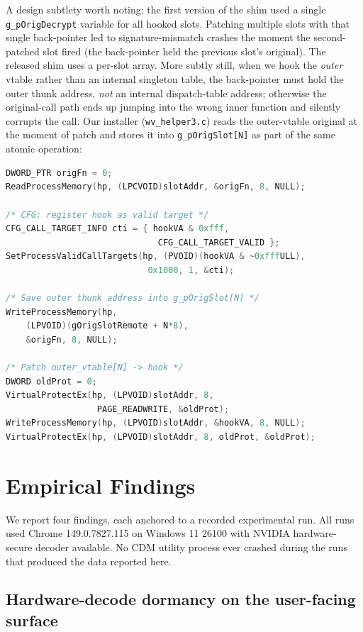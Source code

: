 \documentclass[11pt,letterpaper]{article}
\begin{document}
A design subtlety worth noting: the first version of the shim used
a single \texttt{g\_pOrigDecrypt} variable for all hooked slots.
Patching multiple slots with that single back-pointer led to
signature-mismatch crashes the moment the second-patched slot fired
(the back-pointer held the previous slot's original). The released
shim uses a per-slot array. More subtly still, when we hook the
\emph{outer} vtable rather than an internal singleton table, the
back-pointer must hold the outer thunk address, \emph{not} an
internal dispatch-table address; otherwise the original-call path
ends up jumping into the wrong inner function and silently corrupts
the call. Our installer (\texttt{wv\_helper3.c}) reads the
outer-vtable original at the moment of patch and stores it into
\texttt{g\_pOrigSlot[N]} as part of the same atomic operation:

\begin{lstlisting}[language=C, basicstyle=\ttfamily\scriptsize]
DWORD_PTR origFn = 0;
ReadProcessMemory(hp, (LPCVOID)slotAddr, &origFn, 8, NULL);

/* CFG: register hook as valid target */
CFG_CALL_TARGET_INFO cti = { hookVA & 0xfff,
                              CFG_CALL_TARGET_VALID };
SetProcessValidCallTargets(hp, (PVOID)(hookVA & ~0xfffULL),
                            0x1000, 1, &cti);

/* Save outer thunk address into g_pOrigSlot[N] */
WriteProcessMemory(hp,
    (LPVOID)(gOrigSlotRemote + N*8),
    &origFn, 8, NULL);

/* Patch outer_vtable[N] -> hook */
DWORD oldProt = 0;
VirtualProtectEx(hp, (LPVOID)slotAddr, 8,
                  PAGE_READWRITE, &oldProt);
WriteProcessMemory(hp, (LPVOID)slotAddr, &hookVA, 8, NULL);
VirtualProtectEx(hp, (LPVOID)slotAddr, 8, oldProt, &oldProt);
\end{lstlisting}

\section{Empirical Findings}
\label{sec:findings}

We report four findings, each anchored to a recorded experimental
run. All runs used Chrome 149.0.7827.115 on Windows 11 26100 with
NVIDIA hardware-secure decoder available. No CDM utility process
ever crashed during the runs that produced the data reported here.

\subsection{Hardware-decode dormancy on the user-facing surface}
\label{sec:findings-dormancy}
\end{document}
